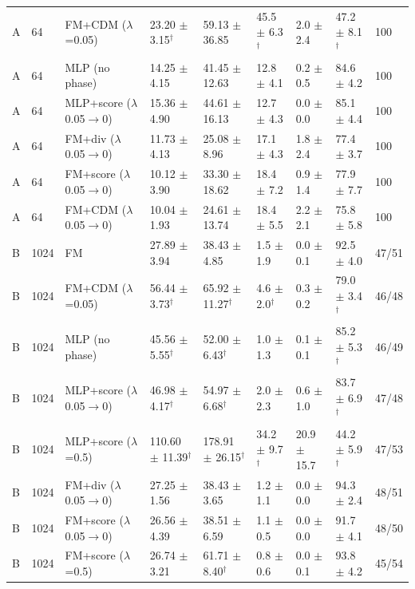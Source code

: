 \begin{tabular}{lllllllll}
A & 64 & FM+CDM ($\lambda$=0.05) & 23.20 $\pm$ 3.15$^\dagger$ & 59.13 $\pm$ 36.85 & 45.5 $\pm$ 6.3$^\dagger$ & 2.0 $\pm$ 2.4 & 47.2 $\pm$ 8.1$^\dagger$ & 100 \\
A & 64 & MLP (no phase) & 14.25 $\pm$ 4.15 & 41.45 $\pm$ 12.63 & 12.8 $\pm$ 4.1 & 0.2 $\pm$ 0.5 & 84.6 $\pm$ 4.2 & 100 \\
A & 64 & MLP+score ($\lambda$ 0.05$\to$0) & 15.36 $\pm$ 4.90 & 44.61 $\pm$ 16.13 & 12.7 $\pm$ 4.3 & 0.0 $\pm$ 0.0 & 85.1 $\pm$ 4.4 & 100 \\
A & 64 & FM+div ($\lambda$ 0.05$\to$0) & 11.73 $\pm$ 4.13 & 25.08 $\pm$ 8.96 & 17.1 $\pm$ 4.3 & 1.8 $\pm$ 2.4 & 77.4 $\pm$ 3.7 & 100 \\
A & 64 & FM+score ($\lambda$ 0.05$\to$0) & 10.12 $\pm$ 3.90 & 33.30 $\pm$ 18.62 & 18.4 $\pm$ 7.2 & 0.9 $\pm$ 1.4 & 77.9 $\pm$ 7.7 & 100 \\
A & 64 & FM+CDM ($\lambda$ 0.05$\to$0) & 10.04 $\pm$ 1.93 & 24.61 $\pm$ 13.74 & 18.4 $\pm$ 5.5 & 2.2 $\pm$ 2.1 & 75.8 $\pm$ 5.8 & 100 \\
\midrule
B & 1024 & FM & 27.89 $\pm$ 3.94 & 38.43 $\pm$ 4.85 & 1.5 $\pm$ 1.9 & 0.0 $\pm$ 0.1 & 92.5 $\pm$ 4.0 & 47/51 \\
B & 1024 & FM+CDM ($\lambda$=0.05) & 56.44 $\pm$ 3.73$^\dagger$ & 65.92 $\pm$ 11.27$^\dagger$ & 4.6 $\pm$ 2.0$^\dagger$ & 0.3 $\pm$ 0.2 & 79.0 $\pm$ 3.4$^\dagger$ & 46/48 \\
B & 1024 & MLP (no phase) & 45.56 $\pm$ 5.55$^\dagger$ & 52.00 $\pm$ 6.43$^\dagger$ & 1.0 $\pm$ 1.3 & 0.1 $\pm$ 0.1 & 85.2 $\pm$ 5.3$^\dagger$ & 46/49 \\
B & 1024 & MLP+score ($\lambda$ 0.05$\to$0) & 46.98 $\pm$ 4.17$^\dagger$ & 54.97 $\pm$ 6.68$^\dagger$ & 2.0 $\pm$ 2.3 & 0.6 $\pm$ 1.0 & 83.7 $\pm$ 6.9$^\dagger$ & 47/48 \\
B & 1024 & MLP+score ($\lambda$=0.5) & 110.60 $\pm$ 11.39$^\dagger$ & 178.91 $\pm$ 26.15$^\dagger$ & 34.2 $\pm$ 9.7$^\dagger$ & 20.9 $\pm$ 15.7 & 44.2 $\pm$ 5.9$^\dagger$ & 47/53 \\
B & 1024 & FM+div ($\lambda$ 0.05$\to$0) & 27.25 $\pm$ 1.56 & 38.43 $\pm$ 3.65 & 1.2 $\pm$ 1.1 & 0.0 $\pm$ 0.0 & 94.3 $\pm$ 2.4 & 48/51 \\
B & 1024 & FM+score ($\lambda$ 0.05$\to$0) & 26.56 $\pm$ 4.39 & 38.51 $\pm$ 6.59 & 1.1 $\pm$ 0.5 & 0.0 $\pm$ 0.0 & 91.7 $\pm$ 4.1 & 48/50 \\
B & 1024 & FM+score ($\lambda$=0.5) & 26.74 $\pm$ 3.21 & 61.71 $\pm$ 8.40$^\dagger$ & 0.8 $\pm$ 0.6 & 0.0 $\pm$ 0.1 & 93.8 $\pm$ 4.2 & 45/54 \\

\end{tabular}
